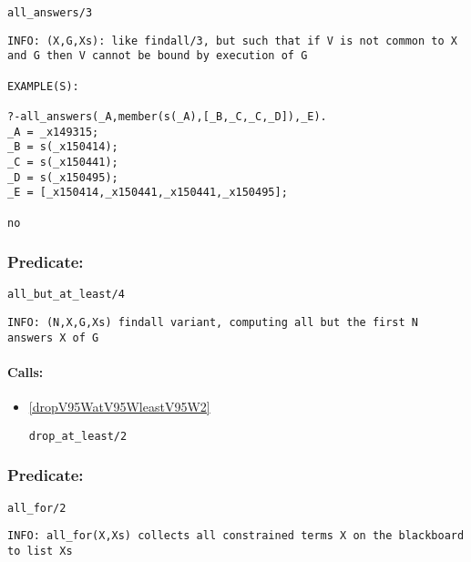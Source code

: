 \begin{verbatim}
all_answers/3
\end{verbatim}

{\small \begin{verbatim}
INFO: (X,G,Xs): like findall/3, but such that if V is not common to X and G then V cannot be bound by execution of G

EXAMPLE(S):

?-all_answers(_A,member(s(_A),[_B,_C,_C,_D]),_E).
_A = _x149315;
_B = s(_x150414);
_C = s(_x150441);
_D = s(_x150495);
_E = [_x150414,_x150441,_x150441,_x150495];

no

\end{verbatim}}

\subsubsection{Predicate:} \label{allV95WbutV95WatV95WleastV95W4}

\begin{verbatim}
all_but_at_least/4
\end{verbatim}

{\small \begin{verbatim}
INFO: (N,X,G,Xs) findall variant, computing all but the first N answers X of G

\end{verbatim}}
\paragraph{Calls:} 
\begin{itemize}
\item \ref{dropV95WatV95WleastV95W2} 
\begin{verbatim}
drop_at_least/2
\end{verbatim}

\end{itemize}

\subsubsection{Predicate:} \label{allV95WforV95W2}

\begin{verbatim}
all_for/2
\end{verbatim}

{\small \begin{verbatim}
INFO: all_for(X,Xs) collects all constrained terms X on the blackboard to list Xs

\end{verbatim}}

